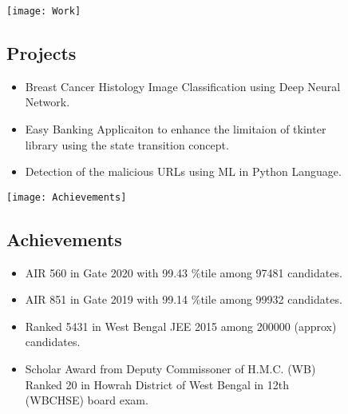 \documentclass[12pt]{article}
\begin{document}
\begin{figure}[!hbt]

\begin{minipage}{0.45\textwidth}
\texttt{[image: Work]}
\vspace{-0.2in}
\subsection*{Projects}
\begin{itemize}
\item
Breast Cancer Histology Image Classification using Deep Neural Network.
\item
Easy Banking Applicaiton to enhance the limitaion of tkinter library using the state transition concept.
\item
Detection of the malicious URLs using ML in Python Language.

\end{itemize}
\end{minipage}
\hfill
\begin{minipage}{0.50\textwidth}
\vspace{-0.6in}
\texttt{[image: Achievements]}
\vspace{-0.2in}
\subsection*{Achievements}

\begin{itemize}
\item
AIR 560 in Gate 2020 with 99.43 \%tile among 97481 candidates.
\item
AIR 851 in Gate 2019 with 99.14 \%tile among 99932 candidates.
\item
Ranked 5431 in West Bengal JEE 2015 among 200000 (approx) candidates. 
\item
Scholar Award from Deputy Commissoner of H.M.C. (WB) Ranked 20 in Howrah District of West Bengal in 12th (WBCHSE) board exam.
\end{itemize}

\end{minipage}







\end{figure}
\end{document}

